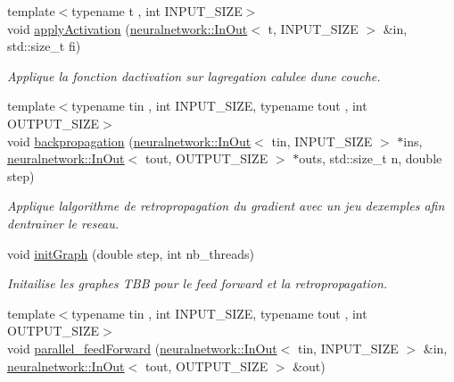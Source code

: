 \begin{DoxyCompactItemize}
{\footnotesize template$<$typename t , int I\+N\+P\+U\+T\+\_\+\+S\+I\+ZE$>$ }\\void \mbox{\hyperlink{classneuralnetwork_1_1_perceptron_ac65162cfaacf1d9e9493a0f71efe84f5}{apply\+Activation}} (\mbox{\hyperlink{_perceptron_8hpp_a1df3992453d71de615dab4ca5eadba8d}{neuralnetwork\+::\+In\+Out}}$<$ t, I\+N\+P\+U\+T\+\_\+\+S\+I\+ZE $>$ \&in, std\+::size\+\_\+t fi)
\begin{DoxyCompactList}\small\item\em Applique la fonction d\textquotesingle{}activation sur l\textquotesingle{}agregation calulee d\textquotesingle{}une couche. \end{DoxyCompactList}\item 
{\footnotesize template$<$typename tin , int I\+N\+P\+U\+T\+\_\+\+S\+I\+ZE, typename tout , int O\+U\+T\+P\+U\+T\+\_\+\+S\+I\+ZE$>$ }\\void \mbox{\hyperlink{classneuralnetwork_1_1_perceptron_a3aef48d797fceda980d1cbf63ba62eff}{backpropagation}} (\mbox{\hyperlink{_perceptron_8hpp_a1df3992453d71de615dab4ca5eadba8d}{neuralnetwork\+::\+In\+Out}}$<$ tin, I\+N\+P\+U\+T\+\_\+\+S\+I\+ZE $>$ $\ast$ins, \mbox{\hyperlink{_perceptron_8hpp_a1df3992453d71de615dab4ca5eadba8d}{neuralnetwork\+::\+In\+Out}}$<$ tout, O\+U\+T\+P\+U\+T\+\_\+\+S\+I\+ZE $>$ $\ast$outs, std\+::size\+\_\+t n, double step)
\begin{DoxyCompactList}\small\item\em Applique l\textquotesingle{}algorithme de retropropagation du gradient avec un jeu d\textquotesingle{}exemples afin d\textquotesingle{}entrainer le reseau. \end{DoxyCompactList}\item 
void \mbox{\hyperlink{classneuralnetwork_1_1_perceptron_a220623af970ea20a00bc2d9096946cbc}{init\+Graph}} (double step, int nb\+\_\+threads)
\begin{DoxyCompactList}\small\item\em Initailise les graphes T\+BB pour le feed forward et la retropropagation. \end{DoxyCompactList}\item 
{\footnotesize template$<$typename tin , int I\+N\+P\+U\+T\+\_\+\+S\+I\+ZE, typename tout , int O\+U\+T\+P\+U\+T\+\_\+\+S\+I\+ZE$>$ }\\void \mbox{\hyperlink{classneuralnetwork_1_1_perceptron_a759d5647ad309215f083d5c8519838ee}{parallel\+\_\+feed\+Forward}} (\mbox{\hyperlink{_perceptron_8hpp_a1df3992453d71de615dab4ca5eadba8d}{neuralnetwork\+::\+In\+Out}}$<$ tin, I\+N\+P\+U\+T\+\_\+\+S\+I\+ZE $>$ \&in, \mbox{\hyperlink{_perceptron_8hpp_a1df3992453d71de615dab4ca5eadba8d}{neuralnetwork\+::\+In\+Out}}$<$ tout, O\+U\+T\+P\+U\+T\+\_\+\+S\+I\+ZE $>$ \&out)

\end{DoxyCompactItemize}
